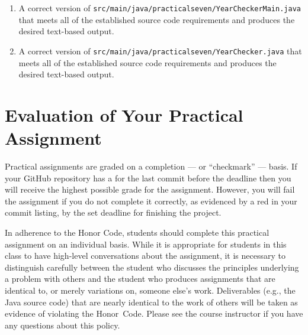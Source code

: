 \documentclass[11pt]{article}
\newcommand{\mainprogramsource}{\lstinline{src/main/java/practicalseven/YearCheckerMain.java}}
\newcommand{\secondprogramsource}{\lstinline{src/main/java/practicalseven/YearChecker.java}}
\newcommand{\checkmark}{\ding{51}}
\newcommand{\naughtmark}{\ding{55}}
\begin{document}
\begin{enumerate}

\setlength{\itemsep}{0in}

\item A correct version of \mainprogramsource{} that meets all of the
  established source code requirements and produces the desired text-based
  output.

\item A correct version of \secondprogramsource{} that meets all of the
  established source code requirements and produces the desired text-based
  output.

\end{enumerate}

\section*{Evaluation of Your Practical Assignment}

Practical assignments are graded on a completion --- or ``checkmark'' --- basis.
If your GitHub repository has a \checkmark{} for the last commit before the
deadline then you will receive the highest possible grade for the assignment.
However, you will fail the assignment if you do not complete it correctly, as
evidenced by a red \naughtmark{} in your commit listing, by the set deadline for
finishing the project.


In adherence to the Honor Code, students should complete this practical
assignment on an individual basis. While it is appropriate for students in this
class to have high-level conversations about the assignment, it is necessary to
distinguish carefully between the student who discusses the principles
underlying a problem with others and the student who produces assignments that
are identical to, or merely variations on, someone else's work. Deliverables
(e.g., the Java source code) that are nearly identical to the work of others
will be taken as evidence of violating the \mbox{Honor Code}. Please see the
course instructor if you have any questions about this policy.
\end{document}
